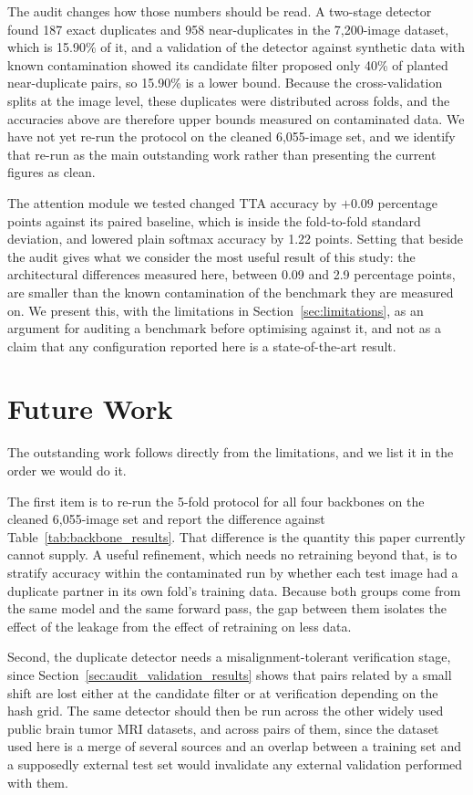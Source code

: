 \documentclass[11pt]{article}
\begin{document}
The audit changes how those numbers should be read. A two-stage detector found 187 exact duplicates and 958 near-duplicates in the 7,200-image dataset, which is 15.90\% of it, and a validation of the detector against synthetic data with known contamination showed its candidate filter proposed only 40\% of planted near-duplicate pairs, so 15.90\% is a lower bound. Because the cross-validation splits at the image level, these duplicates were distributed across folds, and the accuracies above are therefore upper bounds measured on contaminated data. We have not yet re-run the protocol on the cleaned 6,055-image set, and we identify that re-run as the main outstanding work rather than presenting the current figures as clean.

The attention module we tested changed TTA accuracy by $+0.09$ percentage points against its paired baseline, which is inside the fold-to-fold standard deviation, and lowered plain softmax accuracy by 1.22 points. Setting that beside the audit gives what we consider the most useful result of this study: the architectural differences measured here, between 0.09 and 2.9 percentage points, are smaller than the known contamination of the benchmark they are measured on. We present this, with the limitations in Section~\ref{sec:limitations}, as an argument for auditing a benchmark before optimising against it, and not as a claim that any configuration reported here is a state-of-the-art result.

\section{Future Work}
\label{sec:futurework}
The outstanding work follows directly from the limitations, and we list it in the order we would do it.

The first item is to re-run the 5-fold protocol for all four backbones on the cleaned 6,055-image set and report the difference against Table~\ref{tab:backbone_results}. That difference is the quantity this paper currently cannot supply. A useful refinement, which needs no retraining beyond that, is to stratify accuracy within the contaminated run by whether each test image had a duplicate partner in its own fold's training data. Because both groups come from the same model and the same forward pass, the gap between them isolates the effect of the leakage from the effect of retraining on less data.

Second, the duplicate detector needs a misalignment-tolerant verification stage, since Section~\ref{sec:audit_validation_results} shows that pairs related by a small shift are lost either at the candidate filter or at verification depending on the hash grid. The same detector should then be run across the other widely used public brain tumor MRI datasets, and across pairs of them, since the dataset used here is a merge of several sources and an overlap between a training set and a supposedly external test set would invalidate any external validation performed with them.
\end{document}
